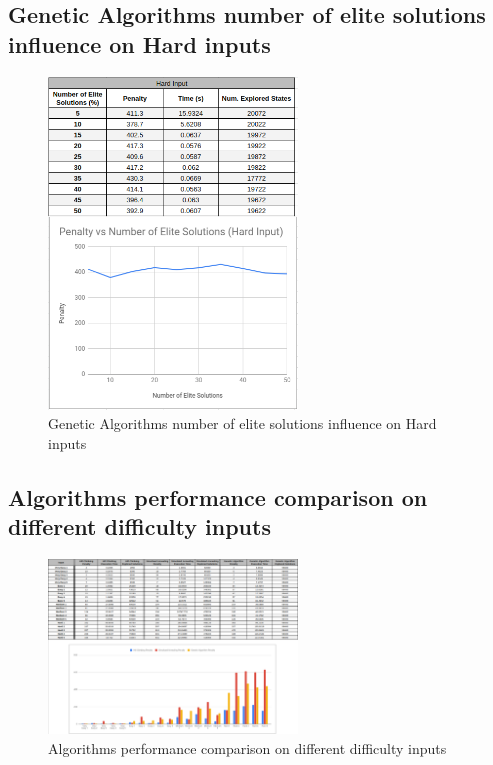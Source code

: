 \documentclass[conference]{IEEEtran}
\begin{document}
\subsection{Genetic Algorithms number of elite solutions influence on Hard inputs}

\begin{figure}[H]
    \centerline{\includegraphics[width=250px]{elite_hard.png}}
    \caption{Genetic Algorithms number of elite solutions influence on Hard inputs}
\end{figure}

\subsection{Algorithms performance comparison on different difficulty inputs}

\begin{figure}[H]
    \centerline{\includegraphics[width=250px]{comparison.png}}
    \caption{Algorithms performance comparison on different difficulty inputs}
\end{figure}
\end{document}
